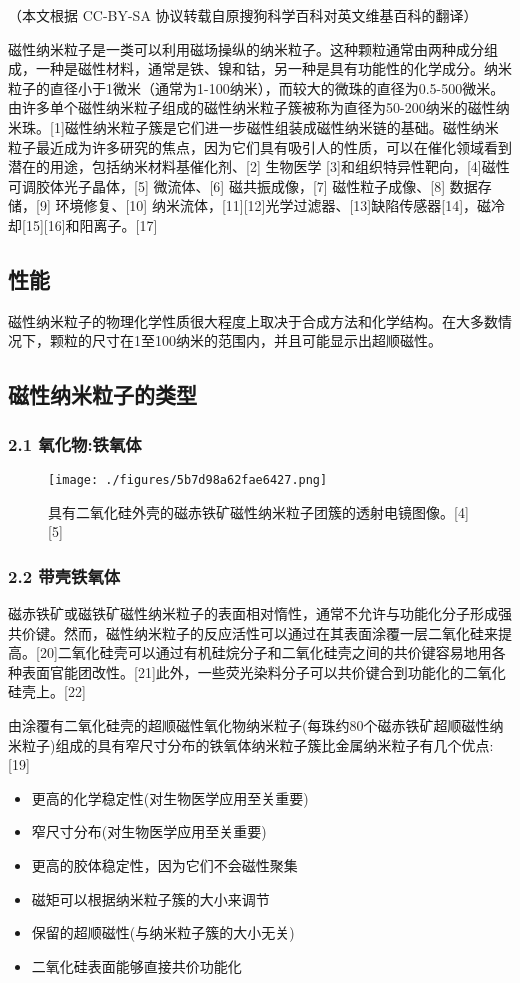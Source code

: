 
（本文根据 CC-BY-SA 协议转载自原搜狗科学百科对英文维基百科的翻译）

磁性纳米粒子是一类可以利用磁场操纵的纳米粒子。这种颗粒通常由两种成分组成，一种是磁性材料，通常是铁、镍和钴，另一种是具有功能性的化学成分。纳米粒子的直径小于1微米（通常为1-100纳米），而较大的微珠的直径为0.5-500微米。由许多单个磁性纳米粒子组成的磁性纳米粒子簇被称为直径为50-200纳米的磁性纳米珠。[1]磁性纳米粒子簇是它们进一步磁性组装成磁性纳米链的基础。磁性纳米粒子最近成为许多研究的焦点，因为它们具有吸引人的性质，可以在催化领域看到潜在的用途，包括纳米材料基催化剂、[2] 生物医学 [3]和组织特异性靶向，[4]磁性可调胶体光子晶体，[5] 微流体、[6] 磁共振成像，[7] 磁性粒子成像、[8] 数据存储，[9] 环境修复、[10] 纳米流体，[11][12]光学过滤器、[13]缺陷传感器[14]，磁冷却[15][16]和阳离子。[17]

\subsection{性能}
磁性纳米粒子的物理化学性质很大程度上取决于合成方法和化学结构。在大多数情况下，颗粒的尺寸在1至100纳米的范围内，并且可能显示出超顺磁性。

\subsection{磁性纳米粒子的类型}
\subsubsection{2.1 氧化物:铁氧体}
\begin{figure}[ht]
\centering
\texttt{[image: ./figures/5b7d98a62fae6427.png]}
\caption{具有二氧化硅外壳的磁赤铁矿磁性纳米粒子团簇的透射电镜图像。[4][5]} \label{fig_CXNMLZ_1}
\end{figure}

\subsubsection{2.2 带壳铁氧体}
磁赤铁矿或磁铁矿磁性纳米粒子的表面相对惰性，通常不允许与功能化分子形成强共价键。然而，磁性纳米粒子的反应活性可以通过在其表面涂覆一层二氧化硅来提高。[20]二氧化硅壳可以通过有机硅烷分子和二氧化硅壳之间的共价键容易地用各种表面官能团改性。[21]此外，一些荧光染料分子可以共价键合到功能化的二氧化硅壳上。[22]

由涂覆有二氧化硅壳的超顺磁性氧化物纳米粒子(每珠约80个磁赤铁矿超顺磁性纳米粒子)组成的具有窄尺寸分布的铁氧体纳米粒子簇比金属纳米粒子有几个优点:[19]
\begin{itemize}
\item 更高的化学稳定性(对生物医学应用至关重要)
\item 窄尺寸分布(对生物医学应用至关重要)
\item 更高的胶体稳定性，因为它们不会磁性聚集
\item 磁矩可以根据纳米粒子簇的大小来调节
\item 保留的超顺磁性(与纳米粒子簇的大小无关)
\item 二氧化硅表面能够直接共价功能化
\end{itemize}

